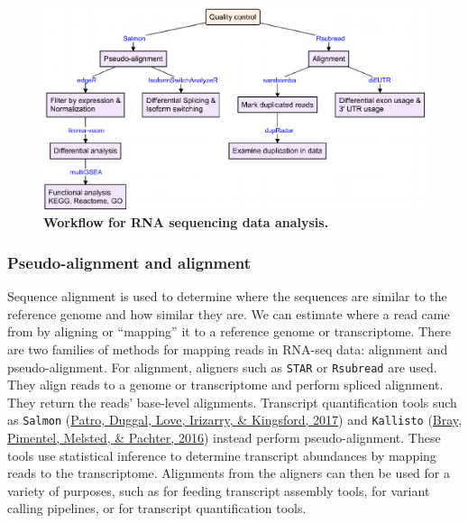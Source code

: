 \documentclass[12pt,twoside]{reedthesis}
\begin{document}
\begin{figure}[H]

{\centering \includegraphics{thesis_files/figure-latex/mf4-1} 

}

\caption[Workflow for RNA sequencing data analysis]{\textbf{Workflow for RNA sequencing data analysis.}}\label{fig:mf4}
\end{figure}
\hypertarget{m3.2.1}{%
\subsubsection*{Pseudo-alignment and alignment}\label{m3.2.1}}

Sequence alignment is used to determine where the sequences are similar
to the reference genome and how similar they are. We can estimate where
a read came from by aligning or ``mapping'' it to a reference genome or
transcriptome. There are two families of methods for mapping reads in
RNA-seq data: alignment and pseudo-alignment. For alignment, aligners
such as \texttt{STAR} or \texttt{Rsubread} are used. They align reads to a genome or
transcriptome and perform spliced alignment. They return the reads'
base-level alignments. Transcript quantification tools such as \texttt{Salmon}
(\protect\hyperlink{ref-patro2017}{Patro, Duggal, Love, Irizarry, \& Kingsford, 2017}) and \texttt{Kallisto} (\protect\hyperlink{ref-bray2016}{Bray, Pimentel, Melsted, \& Pachter, 2016}) instead perform pseudo-alignment.
These tools use statistical inference to determine transcript abundances
by mapping reads to the transcriptome. Alignments from the aligners can
then be used for a variety of purposes, such as for feeding transcript
assembly tools, for variant calling pipelines, or for transcript
quantification tools.
\end{document}
